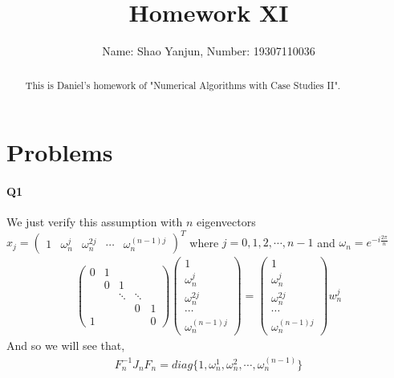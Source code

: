 \documentclass[11pt]{article}
\title{Homework XI}
\author{Name: Shao Yanjun, Number: 19307110036}
\begin{document}
\maketitle

\begin{abstract}
This is Daniel's homework of  "Numerical Algorithms with Case Studies II".
\end{abstract}
\section{Problems}
\paragraph{Q1}
We just verify this assumption with $n$ eigenvectors $x_j=\begin{pmatrix}
	1 & \omega_n^j & \omega_n^{2j} & \cdots &\omega_n^{(n-1)j}
\end{pmatrix}^T$ where $j=0,1,2,\cdots,n-1$ and $\omega_n=e^{-i\frac{2\pi}{n}}$
\begin{align}
	\begin{pmatrix}
		0 & 1 &   &  &\\
		  & 0 & 1 &  &\\
	      &  &\ddots&\ddots\\
		  &  &   &0 &1\\
		1 &  &   &  &0
	\end{pmatrix}
	\begin{pmatrix}
		1 \\
		\omega_n^j\\
		\omega_n^{2j}\\
		\cdots\\
		\omega_n^{(n-1)j}
	\end{pmatrix}
	=\begin{pmatrix}
		1 \\
		\omega_n^j\\
		\omega_n^{2j}\\
		\cdots\\
		\omega_n^{(n-1)j}
	\end{pmatrix} w_n^j
\end{align}
And so we will see that,
\begin{align}
	F^{-1}_nJ_nF_n=diag\{1,\omega_n^1,\omega_n^{2},\cdots,\omega_n^{(n-1)}\}
\end{align}
\end{document}
